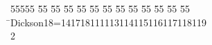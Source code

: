 %
%
\begin{tabbing}
55555 \= 55 \= 55 \= 55 \= 55 \= 55 \= 55 \= 55 \= 55 \= 55 \= 55 \= 55 \= 55 \= \>Dickson18=141718111113114115116117118119\\[0pt]
2\>\end{tabbing}
